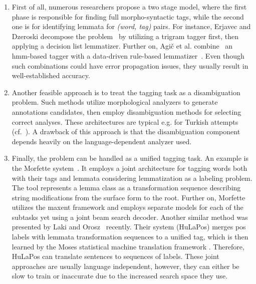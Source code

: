 \begin{enumerate}
  \item First of all, numerous researchers propose a two stage model, where the first phase is responsible for finding full morpho-syntactic tags, while the second one is for identifying lemmata for \emph{(word, tag)} pairs. 
  For instance, Erjavec and Dzeroski decompose the problem~\cite{Erjavec2004} by utilizing a trigram  tagger first, then applying a decision list lemmatizer. \label{part:general-lemmatization}
  Further on, Agič et al. combine~\cite{Agic2013} an \acrshort{hmm}-based tagger with a data-driven rule-based lemmatizer~\cite{Jongejan}. 
  Even though such combinations could have error propagation issues, they usually result in well-established accuracy.
  \item Another feasible approach is to treat the tagging task as a disambiguation problem. 
  Such methods utilize morphological analyzers to generate annotations candidates, then employ disambiguation methods for selecting correct analyses.
  These architectures are typical e.g. for Turkish attempts (cf.~\cite{Sak2007,Hakkani-Tur2002}).
  A drawback of this approach is that the disambiguation component depends heavily on the language-dependent analyzer used.
  \item Finally, the problem can be handled as a unified tagging task.
  An example is the Morfette system~\cite{Chrupaa2008}.
  It employs a joint architecture for tagging words both with their tags and lemmata considering lemmatization as a labeling problem.
  The tool represents a lemma class as a transformation sequence describing string modifications from the surface form to the root.
  Further on, Morfette utilizes the \acrshort{maxent} framework and employs separate models for each of the subtasks yet using a joint beam search decoder.
  Another similar method was presented by Laki and Orosz~\cite{Laki2013} recently.
  Their system (HuLaPos) merges \gls{pos} labels with lemmata transformation sequences to a unified tag, which is then learned by the Moses statistical machine translation framework \cite{Koehn2007}.
  Therefore, HuLaPos can translate sentences to sequences of labels.
  These joint approaches are usually language independent, however, they can either be slow to train or inaccurate due to the increased search space they use.
\end{enumerate}

